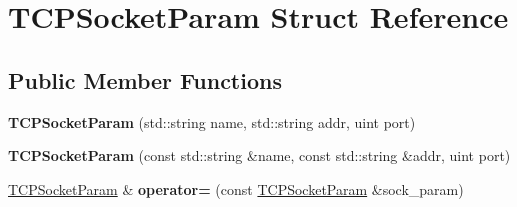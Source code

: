 \hypertarget{struct_t_c_p_socket_param}{}\section{T\+C\+P\+Socket\+Param Struct Reference}
\label{struct_t_c_p_socket_param}
\subsection*{Public Member Functions}
\begin{DoxyCompactItemize}
\item 
{\bfseries T\+C\+P\+Socket\+Param} (std\+::string name, std\+::string addr, uint port)\hypertarget{struct_t_c_p_socket_param_a5f8019ff9672a165db2c225cf86946cb}{}\label{struct_t_c_p_socket_param_a5f8019ff9672a165db2c225cf86946cb}

\item 
{\bfseries T\+C\+P\+Socket\+Param} (const std\+::string \&name, const std\+::string \&addr, uint port)\hypertarget{struct_t_c_p_socket_param_a30919df41998fdf63b706543c55d6bfa}{}\label{struct_t_c_p_socket_param_a30919df41998fdf63b706543c55d6bfa}

\item 
\hyperlink{struct_t_c_p_socket_param}{T\+C\+P\+Socket\+Param} \& {\bfseries operator=} (const \hyperlink{struct_t_c_p_socket_param}{T\+C\+P\+Socket\+Param} \&sock\+\_\+param)\hypertarget{struct_t_c_p_socket_param_a1440243b424ee42cf29c972b609b044a}{}\label{struct_t_c_p_socket_param_a1440243b424ee42cf29c972b609b044a}

\end{DoxyCompactItemize}
